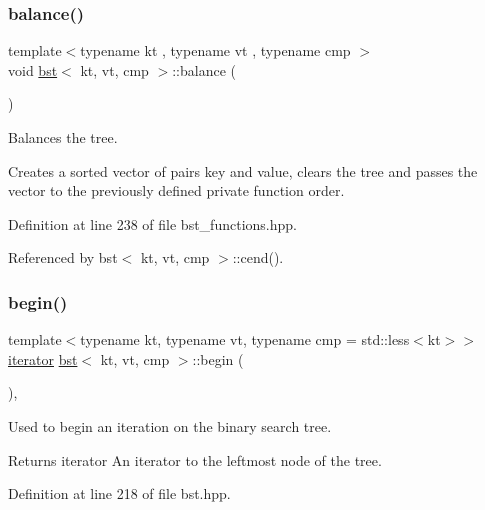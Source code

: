 \subsubsection{\texorpdfstring{balance()}{balance()}}
{\footnotesize\ttfamily template$<$typename kt , typename vt , typename cmp $>$ \\
void \hyperlink{classbst}{bst}$<$ kt, vt, cmp $>$\+::balance (\begin{DoxyParamCaption}{ }\end{DoxyParamCaption})\hspace{0.3cm}{\ttfamily [noexcept]}}



Balances the tree. 

Creates a sorted vector of pairs key and value, clears the tree and passes the vector to the previously defined private function order. 

Definition at line 238 of file bst\+\_\+functions.\+hpp.



Referenced by bst$<$ kt, vt, cmp $>$\+::cend().

\mbox{\label{classbst_a74c68495fd963c501084d129d4c0f5b1}} 
\subsubsection{\texorpdfstring{begin()}{begin()}\hspace{0.1cm}{\footnotesize\ttfamily [1/2]}}
{\footnotesize\ttfamily template$<$typename kt, typename vt, typename cmp = std\+::less$<$kt$>$$>$ \\
\hyperlink{classbst_a429b0445783ff6486882db5dee900ce0}{iterator} \hyperlink{classbst}{bst}$<$ kt, vt, cmp $>$\+::begin (\begin{DoxyParamCaption}{ }\end{DoxyParamCaption})\hspace{0.3cm}{\ttfamily [inline]}, {\ttfamily [noexcept]}}



Used to begin an iteration on the binary search tree. 

\begin{DoxyReturn}{Returns}
iterator An iterator to the leftmost node of the tree. 
\end{DoxyReturn}


Definition at line 218 of file bst.\+hpp.



